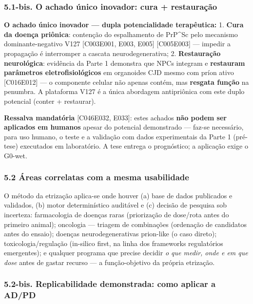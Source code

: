 \documentclass[
  10pt,
]{article}
\begin{document}
\hypertarget{bis.-o-achado-uxfanico-inovador-cura-restaurauxe7uxe3o}{%
\subsubsection{5.1-bis. O achado único inovador: cura +
restauração}\label{bis.-o-achado-uxfanico-inovador-cura-restaurauxe7uxe3o}}

\textbf{O achado único inovador --- dupla potencialidade terapêutica:}
1. \textbf{Cura da doença priônica}: contenção do espalhamento de
PrP\^{}Sc pelo mecanismo dominante-negativo V127 {[}C003\textbar E001,
E003, E005{]} {[}C005\textbar E003{]} --- impedir a propagação é
interromper a cascata neurodegenerativa; 2. \textbf{Restauração
neurológica}: evidência da Parte 1 demonstra que NPCs integram e
\textbf{restauram parâmetros eletrofisiológicos} em organoides CJD mesmo
com príon ativo {[}C016\textbar E012{]} --- o componente celular não
apenas contém, mas \textbf{resgata função} na penumbra. A plataforma
V127 é a única abordagem antipriônica com este duplo potencial (conter +
restaurar).

\textbf{Ressalva mandatória} {[}C046\textbar E032, E033{]}: estes
achados \textbf{não podem ser aplicados em humanos} apesar do potencial
demonstrado --- faz-se necessário, para uso humano, o teste e a
validação com dados experimentais da Parte 1 (pré-tese) executados em
laboratório. A tese entrega o prognóstico; a aplicação exige o G0-wet.

\hypertarget{uxe1reas-correlatas-com-a-mesma-usabilidade}{%
\subsubsection{5.2 Áreas correlatas com a mesma
usabilidade}\label{uxe1reas-correlatas-com-a-mesma-usabilidade}}

O método da etrização aplica-se onde houver (a) base de dados publicados
e validados, (b) motor determinístico auditável e (c) decisão de
pesquisa sob incerteza: farmacologia de doenças raras (priorização de
dose/rota antes do primeiro animal); oncologia --- triagem de
combinações (ordenação de candidatos antes do ensaio); doenças
neurodegenerativas prion-like (o caso direto); toxicologia/regulação
(in-silico first, na linha dos frameworks regulatórios emergentes); e
qualquer programa que precise decidir \emph{o que medir, onde e em que
dose} antes de gastar recurso --- a função-objetivo da própria
etrização.

\hypertarget{bis.-replicabilidade-demonstrada-como-aplicar-a-adpd}{%
\subsubsection{5.2-bis. Replicabilidade demonstrada: como aplicar a
AD/PD}\label{bis.-replicabilidade-demonstrada-como-aplicar-a-adpd}}
\end{document}
